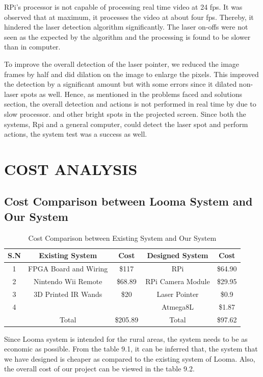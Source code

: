 \documentclass[12pt, a4paper]{article}
\begin{document}
RPi's processor is not capable of processing real time video at 24 fps. It was observed that at maximum, it processes the video at about four fps. Thereby, it hindered the laser detection algorithm significantly. The laser on-offs were not seen as the expected by the algorithm and the processing  is found to be slower than in computer. 

To improve the overall detection of the laser pointer, we reduced the image frames by half and did dilation on the image to enlarge the pixels. This improved the detection by a significant amount but with some errors since it dilated non-laser spots as well. Hence, as mentioned in the problems faced and solutions section, the overall detection and actions is not performed in real time by due to slow processor. and other bright spots in the projected screen. Since both the systems, Rpi and a general computer, could detect the laser spot and perform actions, the system test was a success as well. 

\newpage
\section{COST ANALYSIS}
\subsection{Cost Comparison between Looma System and Our System}
\begin{table}[ht]
\begin{tabular}{|c|c|c|c|c|}
\hline
	S.N  & Existing System & Cost & Designed System & Cost\\
\hline
	1 & FPGA Board and Wiring & \$117 & RPi & \$64.90\\
\hline
	2 & Nintendo Wii Remote & \$68.89 & RPi Camera Module & \$29.95 \\
\hline
	3 & 3D Printed IR Wands & \$20 & Laser Pointer & \$0.9\\
\hline
	4 &  &  & Atmega8L & \$1.87\\
\hline
	 & Total & \$205.89 & Total & \$97.62\\
\hline
\end{tabular}
\caption{Cost Comparison between Existing System and Our System}
\label{tb:sw}
\end{table}

Since Looma system is intended for the rural areas, the system needs to be as economic as possible. From the table 9.1, it can be inferred that, the system that we have designed is cheaper as compared to the existing system of Looma. Also, the overall cost of our project can be viewed in the table 9.2.
\clearpage
\end{document}
